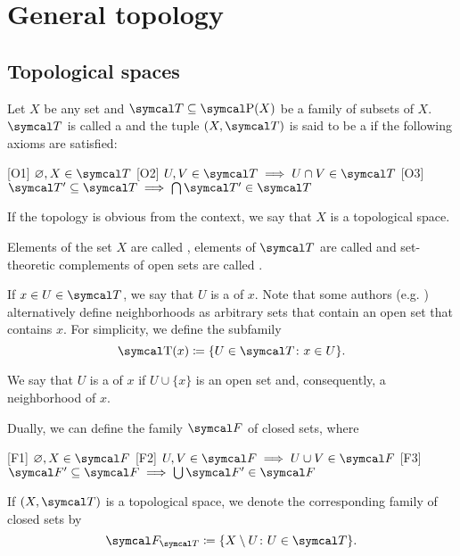 \section{General topology}\label{sec:general_topology}
\subsection{Topological spaces}\label{subsec:topological_spaces}

\begin{definition}\label{def:topological_space}\cite[11]{Engelking1989}
  Let \( X \) be any set and \( \Cal{T} \subseteq \Power(X) \) be a family of subsets of \( X \). \( \Cal{T} \) is called a  and the tuple \( (X, \Cal{T}) \) is said to be a  if the following axioms are satisfied:
  \begin{description}
    [O1] \( \varnothing, X \in \Cal{T} \)
    [O2] \( U, V \in \Cal{T} \implies U \cap V \in \Cal{T} \)
    [O3] \( \Cal{T}' \subseteq \Cal{T} \implies \bigcap \Cal{T}' \in \Cal{T} \)
  \end{description}

  If the topology is obvious from the context, we say that \( X \) is a topological space.

  Elements of the set \( X \) are called , elements of \( \Cal{T} \) are called  and set-theoretic complements of open sets are called .

  If \( x \in U \in \Cal{T} \), we say that \( U \) is a  of \( x \). Note that some authors (e.g. \cite[38]{Kelley1955}) alternatively define neighborhoods as arbitrary sets that contain an open set that contains \( x \). For simplicity, we define the subfamily
  \begin{equation*}
    \CT(x) \coloneqq \{ U \in \Cal{T} \colon x \in U \}.
  \end{equation*}

  We say that \( U \) is a  of \( x \) if \( U \cup \{ x \} \) is an open set and, consequently, a neighborhood of \( x \).

  Dually, we can define the family \( \Cal{F} \) of closed sets, where
  \begin{description}
    [F1] \( \varnothing, X \in \Cal{F} \)
    [F2] \( U, V \in \Cal{F} \implies U \cup V \in \Cal{F} \)
    [F3] \( \Cal{F}' \subseteq \Cal{F} \implies \bigcup \Cal{F}' \in \Cal{F} \)
  \end{description}

  If \( (X, \Cal{T}) \) is a topological space, we denote the corresponding family of closed sets by
  \begin{equation*}
    \Cal{F}_{\Cal{T}} \coloneqq \{ X \setminus U \colon U \in \Cal{T} \}.
  \end{equation*}
\end{definition}

